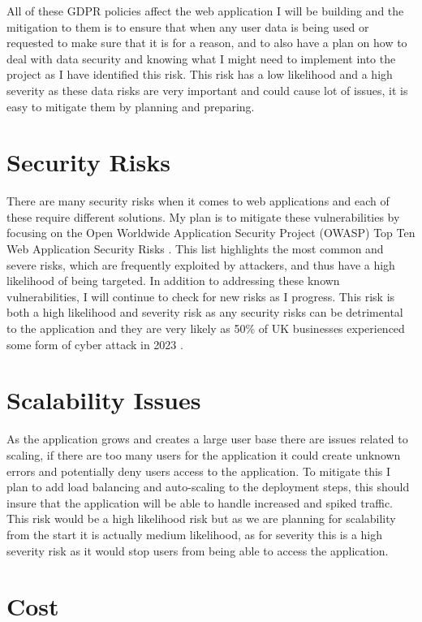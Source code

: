 \documentclass[]{project_report}
\begin{document}
All of these GDPR policies affect the web application I will be building and the mitigation to them is to ensure that when any user data is being used or requested to make sure that it is for a reason, and to also have a plan on how to deal with data security and knowing what I might need to implement into the project as I have identified this risk. This risk has a low likelihood and a high severity as these data risks are very important and could cause lot of issues, it is easy to mitigate them by planning and preparing.


\section{Security Risks}

There are many security risks when it comes to web applications and each of these require different solutions. My plan is to mitigate these vulnerabilities by focusing on the Open Worldwide Application Security Project (OWASP) Top Ten Web Application Security Risks \cite{owasp_2021}. This list highlights the most common and severe risks, which are frequently exploited by attackers, and thus have a high likelihood of being targeted. In addition to addressing these known vulnerabilities, I will continue to check for new risks as I progress. This risk is both a high likelihood and severity risk as any security risks can be detrimental to the application and they are very likely as 50\% of UK businesses experienced some form of cyber attack in 2023 \cite{griffiths_2023}.


\section{Scalability Issues}

As the application grows and creates a large user base there are issues related to scaling, if there are too many users for the application it could create unknown errors and potentially deny users access to the application. To mitigate this I plan to add load balancing and auto-scaling to the deployment steps, this should insure that the application will be able to handle increased and spiked traffic. This risk would be a high likelihood risk but as we are planning for scalability from the start it is actually medium likelihood, as for severity this is a high severity risk as it would stop users from being able to access the application.

\section{Cost}
\end{document}
